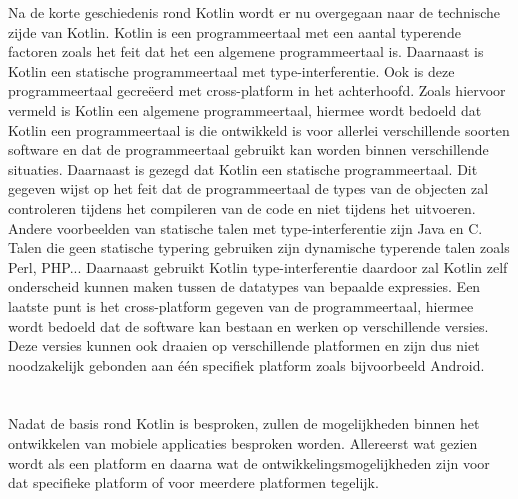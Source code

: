 Na de korte geschiedenis rond Kotlin wordt er nu overgegaan naar de technische zijde van Kotlin. Kotlin is een programmeertaal met een aantal typerende factoren zoals het feit dat het een algemene programmeertaal is. Daarnaast is Kotlin een statische programmeertaal met type-interferentie. Ook is deze programmeertaal gecreëerd met cross-platform in het achterhoofd.\autocite{Oliveira2020} Zoals hiervoor vermeld is Kotlin een algemene programmeertaal, hiermee wordt bedoeld dat Kotlin een programmeertaal is die ontwikkeld is voor allerlei verschillende soorten software en dat de programmeertaal gebruikt kan worden binnen verschillende situaties.\autocite{Skeen2018} Daarnaast is gezegd dat Kotlin een statische programmeertaal. Dit gegeven wijst op het feit dat de programmeertaal de types van de objecten zal controleren tijdens het compileren van de code en niet tijdens het uitvoeren. Andere voorbeelden van statische talen met type-interferentie zijn Java en C. Talen die geen statische typering gebruiken zijn dynamische typerende talen zoals Perl, PHP... Daarnaast gebruikt Kotlin type-interferentie daardoor zal Kotlin zelf onderscheid kunnen maken tussen de datatypes van bepaalde expressies.\autocite{Meijer2004} Een laatste punt is het cross-platform gegeven van de programmeertaal, hiermee wordt bedoeld dat de software kan bestaan en werken op verschillende versies. Deze versies kunnen ook draaien op verschillende platformen en zijn dus niet noodzakelijk gebonden aan één specifiek platform zoals bijvoorbeeld Android.\autocite{Bishop2006}



\section{}
\label{sec:SVZplatformen-ontwikkelingsvormen}


Nadat de basis rond Kotlin is besproken, zullen de mogelijkheden binnen het ontwikkelen van mobiele applicaties besproken worden. Allereerst wat gezien wordt als een platform en daarna wat de ontwikkelingsmogelijkheden zijn voor dat specifieke platform of voor meerdere platformen tegelijk.

\subsection{}
\label{sec:SVZplatform}

